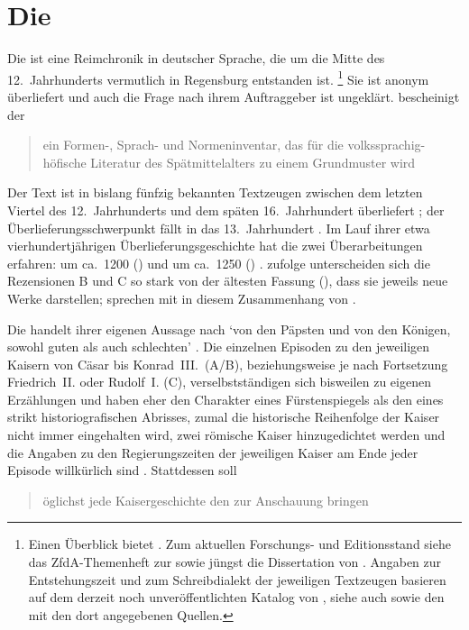 
\section[Die \tit{Kaiserchronik}]{Die }
\label{sec:materialkc}

Die \KC{} ist eine Reimchronik in deutscher Sprache, die um die Mitte
des 12.~Jahrhunderts vermutlich in Regensburg entstanden ist.%
%
	\footnote{Einen Überblick bietet \citet{nellmann1983}. Zum aktuellen
	Forschungs- und Editionsstand siehe das ZfdA-Themenheft zur \KC{}
	\autocite{wolf2019} sowie jüngst die Dissertation von \citet{weis2022}.
	Angaben zur Entstehungszeit und zum Schreibdialekt der jeweiligen
	Textzeugen basieren auf dem derzeit noch unveröffentlichten Katalog von
	\citet{wolf:kckat}, siehe auch \nocite{kcdigital}
	sowie den \citet[s.\,v.~\textit{}]{hsc} mit den dort
	angegebenen Quellen.}
%
Sie ist anonym überliefert und auch die Frage nach ihrem Auftraggeber ist
ungeklärt. \citet[92]{wolf2008} bescheinigt der \KC{}
\blockquote{ein Formen-, Sprach- und Normeninventar, das für die
volkssprachig-höfische Literatur des Spätmittelalters zu einem Grundmuster
wird}.

Der Text ist in bislang fünfzig bekannten Textzeugen zwischen dem letzten
Viertel des 12.~Jahrhunderts \autocites{kc:A1} und dem späten 16.~Jahrhundert
\autocite{kc:T} überliefert \autocite[39, 57]{wolf:kckat}; der
Überlieferungsschwerpunkt fällt in das 13.~Jahrhundert
\autocites[vgl.][s.\,v.~\textit{}]{hsc}{kcdigital}. Im Lauf
ihrer etwa vierhundertjährigen Überlieferungsgeschichte hat die \KC{} zwei
Überarbeitungen erfahren: um ca.~1200 () und um ca.~1250
() \autocites%
{wolf2008}.
\citet[369]{gaertner1995} zufolge unterscheiden sich die Rezensionen B und C so
stark von der ältesten Fassung (), dass sie jeweils neue Werke
darstellen; \citet[142]{chincaetal2019a} sprechen mit \citet{bumkepeters2005b}
in diesem Zusammenhang von .

Die \KC{} handelt ihrer eigenen Aussage nach
`von den Päpsten und von den Königen, sowohl guten als auch schlechten'
\autocite[19--20]{schroeder1895}. Die einzelnen Episoden zu den jeweiligen
Kaisern von Cäsar bis Konrad~III.\ (A/B), beziehungsweise je nach Fortsetzung
Friedrich~II. oder Rudolf~I. (C), verselbstständigen sich bisweilen zu eigenen
Erzählungen und haben eher den Charakter eines Fürstenspiegels als den eines
strikt historiografischen Abrisses, zumal die historische Reihenfolge der
Kaiser nicht immer eingehalten wird, zwei römische Kaiser hinzugedichtet werden
und die Angaben zu den Regierungszeiten der jeweiligen Kaiser am Ende jeder
Episode willkürlich sind \autocite[954--960]{nellmann1983}. Stattdessen soll
\blockcquote[957]{nellmann1983}{öglichst jede Kaisergeschichte
\textelp{} den  \textelp{}
zur Anschauung bringen}.

